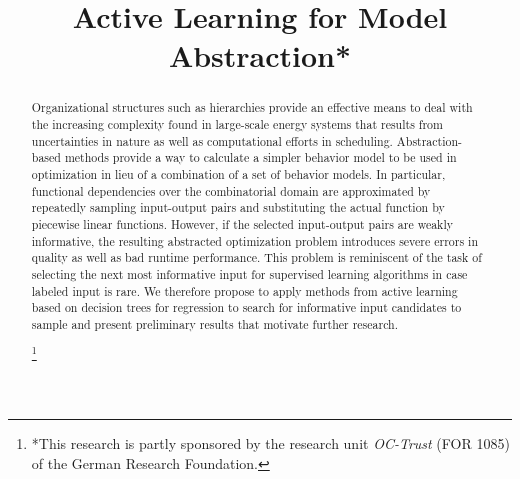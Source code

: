 \documentclass[conference]{IEEEtran}
\newcommand\blfootnote[1]{%
  \begingroup
  \renewcommand\thefootnote{}\footnote{#1}%
  \addtocounter{footnote}{-1}%
  \endgroup
}
\begin{document}
\title{Active Learning for Model Abstraction*}

\author{
}

\maketitle

\begin{abstract}
Organizational structures such as hierarchies provide an effective means to
deal with the increasing complexity found in large-scale energy systems that 
results from uncertainties in nature as well as computational efforts in scheduling. 
Abstraction-based methods provide a way to calculate a simpler behavior model 
to be used in optimization in lieu of a combination of a set of behavior models.
In particular, functional dependencies over the combinatorial domain 
are approximated by repeatedly sampling input-output pairs
and substituting the actual function by piecewise linear functions. However, if
the selected input-output pairs are weakly informative, the resulting abstracted
optimization problem introduces severe errors in quality as well as bad runtime performance.
This problem is reminiscent of the task of selecting the next most informative input for supervised learning
algorithms in case labeled input is rare.
We therefore propose to apply methods from active learning based on decision trees for regression
to search for informative
input candidates to sample and present preliminary results that motivate further research. 

\blfootnote{*This research is partly sponsored by the research unit \emph{OC-Trust} (FOR 1085) of the German Research Foundation.}
\end{abstract}
\end{document}
